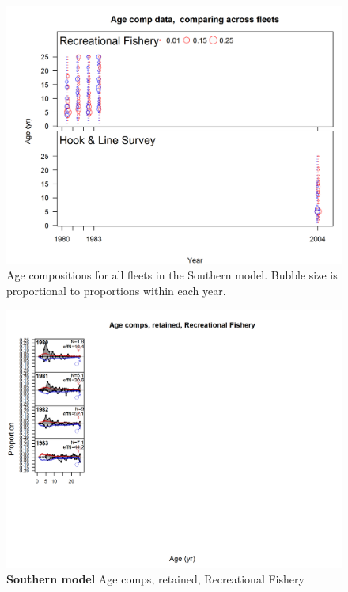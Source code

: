 \documentclass[12pt,]{article}
\begin{document}
\begin{figure}[htbp]
\centering
\includegraphics{r4ss/plots_mod2/comp_agedat__multi-fleet_comparison.png}
\caption{Age compositions for all fleets in the Southern model. Bubble
size is proportional to proportions within each year.
\label{fig:comp_age_bubble_mod2}}
\end{figure}

\FloatBarrier

\newpage

\begin{figure}[htbp]
\centering
\includegraphics{./r4ss/plots_mod2/comp_agefit_flt1mkt2.png}
\caption{\textbf{Southern model} Age comps, retained, Recreational
Fishery \label{fig:mod2_1_comp_agefit_flt1mkt2}}
\end{figure}
\end{document}
